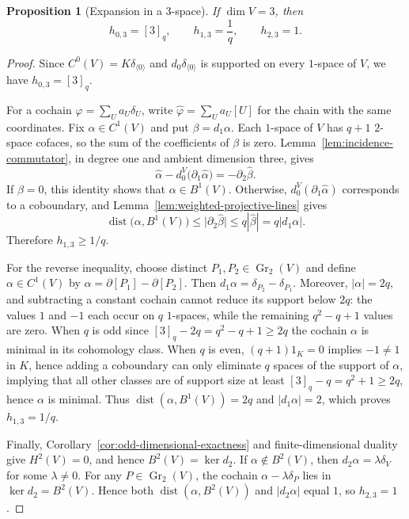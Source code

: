 \documentclass[11pt]{article}
\numberwithin{equation}{section}
\newtheorem{proposition}[theorem]{Proposition}
\newcommand{\Gr}{\operatorname{Gr}}
\begin{document}
\begin{proposition}[Expansion in a $3$-space]
\label{prop:three-dimensional-expansion}
If $\dim V=3$, then
\[
 h_{0,3}=[3]_q,
 \qquad
 h_{1,3}=\frac1q,
 \qquad
 h_{2,3}=1.
\]
\end{proposition}

\begin{proof}
Since $C^0(V)=K\delta_{\langle0\rangle}$ and
$d_0\delta_{\langle0\rangle}$ is supported on every $1$-space of
$V$, we have $h_{0,3}=[3]_q$.

For a cochain $\varphi=\sum_Ua_U\delta_U$, write
$\widehat\varphi=\sum_Ua_U[U]$ for the chain with the same
coordinates. Fix $\alpha\in C^1(V)$ and put $\beta=d_1\alpha$. Each
$1$-space of $V$ has $q+1$ $2$-space cofaces, so the sum of the
coefficients of $\beta$ is zero. Lemma~\ref{lem:incidence-commutator},
in degree one and ambient dimension three, gives
\[
 \widehat\alpha-d_0^V\bigl(\partial_1\widehat\alpha\bigr)
 =-\partial_2\widehat\beta.
\]
If $\beta=0$, this identity shows that $\alpha\in B^1(V)$. Otherwise,
$d_0^V(\partial_1\widehat\alpha)$ corresponds to a coboundary, and
Lemma~\ref{lem:weighted-projective-lines} gives
\[
 \operatorname{dist}\bigl(\alpha,B^1(V)\bigr)
 \le\bigl|\partial_2\widehat\beta\bigr|
 \le q|\widehat\beta|
 =q|d_1\alpha|.
\]
Therefore $h_{1,3}\ge1/q$.

For the reverse inequality, choose distinct
$P_1,P_2\in\Gr_2(V)$ and define $\alpha\in C^1(V)$ by
$\widehat\alpha=\partial[P_1]-\partial[P_2]$.
Then $d_1\alpha=\delta_{P_2}-\delta_{P_1}$. 
Moreover,
$|\alpha|=2q$, and subtracting a
constant cochain cannot reduce its support below $2q$: the values
$1$ and $-1$ each occur on $q$ $1$-spaces, while the remaining
$q^2-q+1$ values are zero. When $q$ is odd since $[3]_q-2q=q^2-q+1\ge2q$ the cochain $\alpha$ is minimal in its cohomology class. When $q$ is even, $(q+1)1_K=0$ implies $-1 \neq 1$ in $K$, hence adding a coboundary can only eliminate $q$ spaces of the support of $\alpha$, implying that all other classes are of support size at least $[3]_q-q=q^2+1 \geq 2q$, hence $\alpha$ is minimal. Thus
$\operatorname{dist}(\alpha,B^1(V))=2q$ and $|d_1\alpha|=2$, which
proves $h_{1,3}=1/q$.

Finally, Corollary~\ref{cor:odd-dimensional-exactness} and
finite-dimensional duality give $H^2(V)=0$, and hence
$B^2(V)=\ker d_2$. If $\alpha\notin B^2(V)$, then
$d_2\alpha=\lambda\delta_V$ for some $\lambda\ne0$. For any
$P\in\Gr_2(V)$, the cochain
$\alpha-\lambda\delta_P$ lies in $\ker d_2=B^2(V)$. Hence both
$\operatorname{dist}(\alpha,B^2(V))$ and $|d_2\alpha|$ equal $1$, so
$h_{2,3}=1$.
\end{proof}
\end{document}
